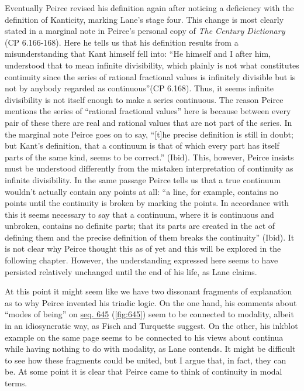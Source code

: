 Eventually Peirce revised his definition again after noticing a deficiency with the definition of Kanticity, marking Lane's stage four. This change is most clearly stated in a marginal note in Peirce's personal copy of \textit{The Century Dictionary} (CP 6.166-168). Here he tells us that his definition results from a misunderstanding that Kant himself fell into: ``He himself and I after him, understood that to mean infinite divisibility, which plainly is not what constitutes continuity since the series of rational fractional values is infinitely divisible but is not by anybody regarded as continuous''(CP 6.168). Thus, it seems infinite divisibility is not itself enough to make a series continuous. The reason Peirce mentions the series of ``rational fractional values'' here is because between every pair of these there are real and rational values that are not part of the series. In the marginal note Peirce goes on to say, ``[t]he precise definition is still in doubt; but Kant's definition, that a continuum is that of which every part has itself parts of the same kind, seems to be correct.'' (Ibid). This, however, Peirce insists must be understood differently from the mistaken interpretation of continuity as infinite divisibility. In the same passage Peirce tells us that a true continuum wouldn't actually contain any points at all: ``a line, for example, contains no points until the continuity is broken by marking the points. In accordance with this it seems necessary to say that a continuum, where it is continuous and unbroken, contains no definite parts; that its parts are created in the act of defining them and the precise definition of them breaks the continuity'' (Ibid). It is not clear why Peirce thought this as of yet and this will be explored in the following chapter. However, the understanding expressed here seems to have persisted relatively unchanged until the end of his life, as Lane claims.

At this point it might seem like we have two dissonant fragments of explanation as to why Peirce invented his triadic logic. On the one hand, his comments about ``modes of being'' on \href{https://iiif.lib.harvard.edu/manifests/view/drs:15255301$645i}{seq. 645} (\ref{fig:645}) seem to be connected to modality, albeit in an idiosyncratic way, as Fisch and Turquette suggest. On the other, his inkblot example on the same page seems to be connected to his views about continua while having nothing to do with modality, as Lane contends. It might be difficult to see how these fragments could be united, but I argue that, in fact, they can be. At some point it is clear that Peirce came to think of continuity in modal terms.

